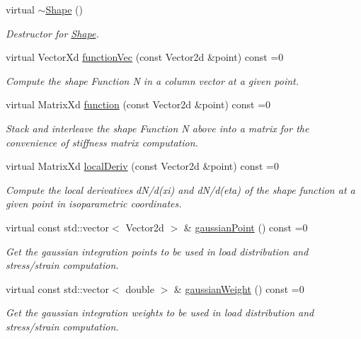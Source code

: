 \begin{DoxyCompactItemize}
\item 
\mbox{\label{class_shape_ac3b9fc48965274893f25b18aa14ba665}} 
virtual \mbox{\hyperlink{class_shape_ac3b9fc48965274893f25b18aa14ba665}{$\sim$\+Shape}} ()
\begin{DoxyCompactList}\small\item\em Destructor for \mbox{\hyperlink{class_shape}{Shape}}. \end{DoxyCompactList}\item 
virtual Vector\+Xd \mbox{\hyperlink{class_shape_a0e0400bca54c29b5097c84ace51ecc7b}{function\+Vec}} (const Vector2d \&point) const =0
\begin{DoxyCompactList}\small\item\em Compute the shape Function N in a column vector at a given point. \end{DoxyCompactList}\item 
virtual Matrix\+Xd \mbox{\hyperlink{class_shape_ab6e0d64b40e09c176ce2ece24bc94a37}{function}} (const Vector2d \&point) const =0
\begin{DoxyCompactList}\small\item\em Stack and interleave the shape Function N above into a matrix for the convenience of stiffness matrix computation. \end{DoxyCompactList}\item 
virtual Matrix\+Xd \mbox{\hyperlink{class_shape_a55575394f656e3ee4b5ac37ea04af8c9}{local\+Deriv}} (const Vector2d \&point) const =0
\begin{DoxyCompactList}\small\item\em Compute the local derivatives d\+N/d(xi) and d\+N/d(eta) of the shape function at a given point in isoparametric coordinates. \end{DoxyCompactList}\item 
virtual const std\+::vector$<$ Vector2d $>$ \& \mbox{\hyperlink{class_shape_afa8029d0991fc5d9054a667823224bd0}{gaussian\+Point}} () const =0
\begin{DoxyCompactList}\small\item\em Get the gaussian integration points to be used in load distribution and stress/strain computation. \end{DoxyCompactList}\item 
virtual const std\+::vector$<$ double $>$ \& \mbox{\hyperlink{class_shape_a4257697bb443af2871a7cc7a82c8c823}{gaussian\+Weight}} () const =0
\begin{DoxyCompactList}\small\item\em Get the gaussian integration weights to be used in load distribution and stress/strain computation. \end{DoxyCompactList}\end{DoxyCompactItemize}


